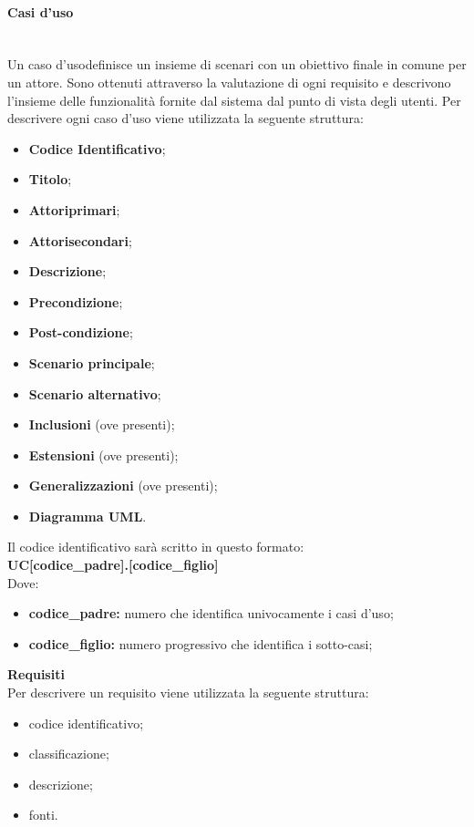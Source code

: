 \paragraph*{Casi d'uso}\mbox{}\\ [1mm]
Un caso d'uso\glosp definisce un insieme di scenari con un obiettivo finale in comune per un attore\glo. Sono ottenuti attraverso la valutazione di ogni requisito e descrivono l'insieme delle funzionalità fornite dal sistema dal punto di vista degli utenti.
Per descrivere ogni caso d'uso viene utilizzata la seguente struttura:
\begin{itemize}
	\item \textbf{Codice Identificativo};
	\item \textbf{Titolo};
	\item \textbf{Attori}\glosp \textbf{primari};
	\item \textbf{Attori}\glosp \textbf{secondari};
	\item \textbf{Descrizione};
	\item \textbf{Precondizione};
	\item \textbf{Post-condizione};
	\item \textbf{Scenario principale};
	\item \textbf{Scenario alternativo};
	\item \textbf{Inclusioni} (ove presenti);
	\item \textbf{Estensioni} (ove presenti);
	\item \textbf{Generalizzazioni} (ove presenti);
	\item \textbf{Diagramma UML}.	
\end{itemize}
Il codice identificativo sarà scritto in questo formato: \\
\textbf{UC[codice\_padre].[codice\_figlio]} \\
Dove:
\begin{itemize}
	\item \textbf{codice\_padre:} numero che identifica univocamente i casi d'uso\glo;
	\item \textbf{codice\_figlio:} numero progressivo che identifica i sotto-casi;
\end{itemize}
\textbf{Requisiti}\\%
Per descrivere un requisito viene utilizzata la seguente struttura:
\begin{itemize}
	\item codice identificativo;
	\item classificazione;
	\item descrizione;
	\item fonti.
\end{itemize} 
